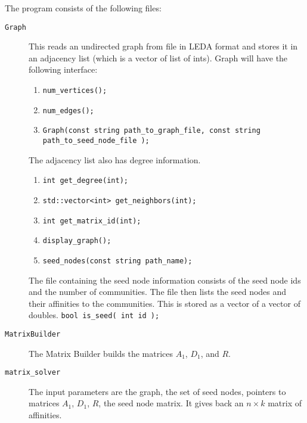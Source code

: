 \documentclass[12pt]{article}
\begin{document}
The program consists of the following files:

\begin{description}
	\item [\texttt{Graph}] This reads an undirected graph from file 
		in LEDA format and stores it in an adjacency list (which is 
		a vector of list of ints). Graph will have the following 
		interface: 
		\begin{enumerate}
			\item \verb|num_vertices();| 
			\item \verb|num_edges();| 
			\item \verb|Graph(const string path_to_graph_file, const string path_to_seed_node_file );|
		\end{enumerate}	
		The adjacency list also has degree information.
		\begin{enumerate}
			\item \verb|int get_degree(int);|
			\item \verb|std::vector<int> get_neighbors(int);|
			\item \verb|int get_matrix_id(int);| 
			\item \verb|display_graph();|
			\item \verb|seed_nodes(const string path_name);|
		\end{enumerate}
		The file containing the seed node information consists of 
		the seed node ids and the number of communities. The file 
		then lists the seed nodes and their affinities to the communities.
		This is stored as a vector of a vector of doubles. 
		\verb|bool is_seed( int id );|
		 
	\item [\texttt{MatrixBuilder}] The Matrix Builder builds the 
		matrices $A_1$, $D_1$, and $R$.

	\item [\texttt{matrix\_solver}] The input parameters are 
		the graph, the set of seed nodes, pointers to matrices $A_1$, $D_1$, 
		$R$, the seed node matrix. It gives back an $n \times k$ matrix of affinities.  
\end{description}
\end{document}
